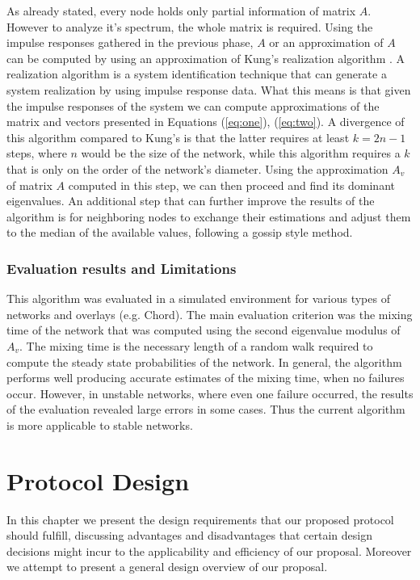 \documentclass[MSc]{icldt}
\begin{document}
As already stated, every node holds only partial information of matrix $A$. However to analyze it's spectrum, the whole matrix is required. Using the impulse responses gathered in the previous phase, $A$ or an approximation of $A$ can be computed by using an approximation of Kung's realization algorithm \cite{1992040} \cite{1164997}. A realization algorithm is a system identification technique that can generate a system realization by using impulse response data. What this means is that given the impulse responses of the system we can compute approximations of the matrix and vectors presented in Equations (\ref{eq:one}), (\ref{eq:two}). A divergence of this algorithm compared to Kung's is that the latter requires at least $k=2n-1$ steps, where $n$ would be the size of the network, while this algorithm requires a $k$ that is only on the order of the network's diameter. Using the approximation $A_v$ of matrix $A$ computed in this step, we can then proceed and find its dominant eigenvalues. An additional step that can further improve the results of the algorithm is for neighboring nodes to exchange their estimations and adjust them to the median of the available values, following a gossip style method.

\subsection{Evaluation results and Limitations}

This algorithm was evaluated in a simulated environment for various types of networks and overlays (e.g. Chord). The main evaluation criterion was the mixing time of the network that was computed using the second eigenvalue modulus of $A_v$. The mixing time is the necessary length of a random walk required to compute the steady state probabilities of the network. In general, the algorithm performs well producing accurate estimates of the mixing time, when no failures occur. However, in unstable networks, where even one failure occurred, the results of the evaluation revealed large errors in some cases. Thus the current algorithm is more applicable to stable networks.  



\chapter{Protocol Design}
\label{sec:design}

In this chapter we present the design requirements that our proposed protocol should fulfill, discussing advantages and disadvantages that certain design decisions might incur to the applicability and efficiency of our proposal. Moreover we attempt to present a general design overview of our proposal.
\end{document}
